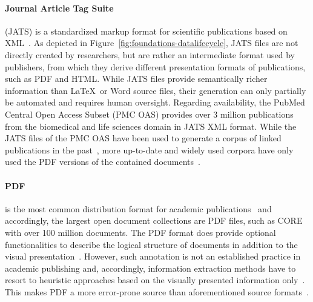 \paragraph{Journal Article Tag Suite}
(JATS) is a standardized markup format for scientific publications based on XML~\cite{Huh2014}. As depicted in Figure~\ref{fig:foundations-datalifecycle}, JATS files are not directly created by researchers, but are rather an intermediate format used by publishers, from which they derive different presentation formats of publications, such as PDF and HTML. While JATS files provide semantically richer information than \LaTeX\ or Word source files, their generation can only partially be automated and requires human oversight. Regarding availability, the PubMed Central Open Access Subset (PMC OAS) provides over 3 million publications from the biomedical and life sciences domain in JATS XML format. While the JATS files of the PMC OAS have been used to generate a corpus of linked publications in the past~\cite{Gipp2015}, more up-to-date and widely used corpora have only used the PDF versions of the contained documents~\cite{Lo2020}.

\paragraph{PDF}
is the most common distribution format for academic publications~\cite{Johnson2018stm} and accordingly, the largest open document collections are PDF files, such as CORE~\cite{core} with over 100 million documents. The PDF format does provide optional functionalities to describe the logical structure of documents in addition to the visual presentation~\cite{ISO32000-2}. However, such annotation is not an established practice in academic publishing and, accordingly, information extraction methods have to resort to heuristic approaches based on the visually presented information only~\cite{Lopez2009,Nasar2018,Faerber2020a}. This makes PDF a more error-prone source than aforementioned source formats~\cite{Bast2017}.


